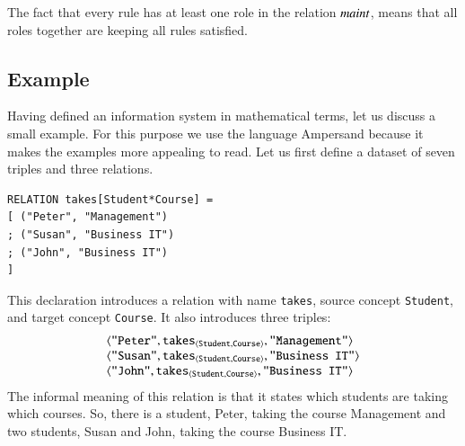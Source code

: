 \documentclass{elsarticle}
\begin{document}
   The fact that every rule has at least one role in the relation $\text{\it maint\/}$, means that all roles together are keeping all rules satisfied.

\subsection{Example}
\label{old IS}
   Having defined an information system in mathematical terms, let us discuss a small example.
   For this purpose we use the language Ampersand
   because it makes the examples more appealing to read.
   Let us first define a dataset of seven triples and three relations.
\begin{verbatim}
RELATION takes[Student*Course] =
[ ("Peter", "Management")
; ("Susan", "Business IT")
; ("John", "Business IT")
]
\end{verbatim}
   This declaration introduces a relation with name \verb#takes#,
   source concept \verb#Student#, and
   target concept \verb#Course#.
   It also introduces three triples:
\[\begin{array}{l}
   \langle{\text{\tt "Peter"}},{\text{\it \text{\tt takes}\/}_{\langle{\text{\tt Student}},{\text{\tt Course}}\rangle}},{\text{\tt "Management"}}\rangle\\
   \langle{\text{\tt "Susan"}},{\text{\it \text{\tt takes}\/}_{\langle{\text{\tt Student}},{\text{\tt Course}}\rangle}},{\text{\tt "Business IT"}}\rangle\\
   \langle{\text{\tt "John"}},{\text{\it \text{\tt takes}\/}_{\langle{\text{\tt Student}},{\text{\tt Course}}\rangle}},{\text{\tt "Business IT"}}\rangle
\end{array}\]
   The informal meaning of this relation is that it states which students are taking which courses.
   So, there is a student, Peter, taking the course Management and two students, Susan and John, taking the course Business IT.
\end{document}
